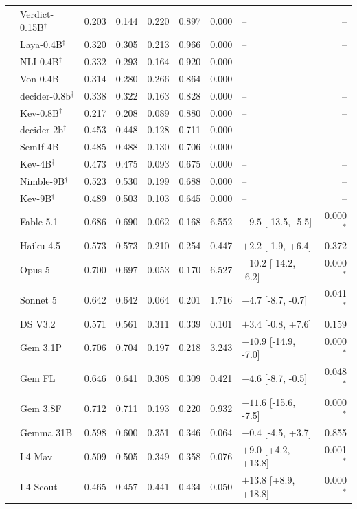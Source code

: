 \begin{longtable}{llrrrrrlr}
 & Verdict-0.15B$^{\dagger}$ & 0.203 & 0.144 & 0.220 & 0.897 & 0.000 & -- & -- \\
 & Laya-0.4B$^{\dagger}$ & 0.320 & 0.305 & 0.213 & 0.966 & 0.000 & -- & -- \\
 & NLI-0.4B$^{\dagger}$ & 0.332 & 0.293 & 0.164 & 0.920 & 0.000 & -- & -- \\
 & Von-0.4B$^{\dagger}$ & 0.314 & 0.280 & 0.266 & 0.864 & 0.000 & -- & -- \\
 & decider-0.8b$^{\dagger}$ & 0.338 & 0.322 & 0.163 & 0.828 & 0.000 & -- & -- \\
 & Kev-0.8B$^{\dagger}$ & 0.217 & 0.208 & 0.089 & 0.880 & 0.000 & -- & -- \\
 & decider-2b$^{\dagger}$ & 0.453 & 0.448 & 0.128 & 0.711 & 0.000 & -- & -- \\
 & SemIf-4B$^{\dagger}$ & 0.485 & 0.488 & 0.130 & 0.706 & 0.000 & -- & -- \\
 & Kev-4B$^{\dagger}$ & 0.473 & 0.475 & 0.093 & 0.675 & 0.000 & -- & -- \\
 & Nimble-9B$^{\dagger}$ & 0.523 & 0.530 & 0.199 & 0.688 & 0.000 & -- & -- \\
 & Kev-9B$^{\dagger}$ & 0.489 & 0.503 & 0.103 & 0.645 & 0.000 & -- & -- \\
 & Fable 5.1 & 0.686 & 0.690 & 0.062 & 0.168 & 6.552 & $-9.5$ [-13.5, -5.5] & 0.000$^{*}$ \\
 & Haiku 4.5 & 0.573 & 0.573 & 0.210 & 0.254 & 0.447 & $+2.2$ [-1.9, +6.4] & 0.372 \\
 & Opus 5 & 0.700 & 0.697 & 0.053 & 0.170 & 6.527 & $-10.2$ [-14.2, -6.2] & 0.000$^{*}$ \\
 & Sonnet 5 & 0.642 & 0.642 & 0.064 & 0.201 & 1.716 & $-4.7$ [-8.7, -0.7] & 0.041$^{*}$ \\
 & DS V3.2 & 0.571 & 0.561 & 0.311 & 0.339 & 0.101 & $+3.4$ [-0.8, +7.6] & 0.159 \\
 & Gem 3.1P & 0.706 & 0.704 & 0.197 & 0.218 & 3.243 & $-10.9$ [-14.9, -7.0] & 0.000$^{*}$ \\
 & Gem FL & 0.646 & 0.641 & 0.308 & 0.309 & 0.421 & $-4.6$ [-8.7, -0.5] & 0.048$^{*}$ \\
 & Gem 3.8F & 0.712 & 0.711 & 0.193 & 0.220 & 0.932 & $-11.6$ [-15.6, -7.5] & 0.000$^{*}$ \\
 & Gemma 31B & 0.598 & 0.600 & 0.351 & 0.346 & 0.064 & $-0.4$ [-4.5, +3.7] & 0.855 \\
 & L4 Mav & 0.509 & 0.505 & 0.349 & 0.358 & 0.076 & $+9.0$ [+4.2, +13.8] & 0.001$^{*}$ \\
 & L4 Scout & 0.465 & 0.457 & 0.441 & 0.434 & 0.050 & $+13.8$ [+8.9, +18.8] & 0.000$^{*}$ \\

\end{longtable}
